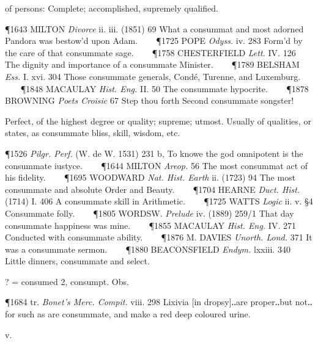 \begin{description}[wide, labelwidth=!, labelindent=0pt]
\begin{myenumerate}
 of persons: Complete; accomplished, supremely qualified.

\P 1643 MILTON  \textit{Divorce} ii. iii. (1851) 69 What a consummat and most adorned Pandora was bestow'd upon Adam.    
\P 1725 POPE  \textit{Odyss.} iv. 283 Form'd by the care of that consummate sage.    
\P 1758 CHESTERFIELD  \textit{Lett.} IV. 126 The dignity and importance of a consummate Minister.    
\P 1789 BELSHAM  \textit{Ess.} I. xvi. 304 Those consummate generals, Condé, Turenne, and Luxemburg.    
\P 1848 MACAULAY  \textit{Hist. Eng.} II. 50 The consummate hypocrite.    
\P 1878 BROWNING  \textit{Poets Croisic} 67 Step thou forth Second consummate songster!

 Perfect, of the highest degree or quality; supreme; utmost. Usually of qualities, or states, as consummate bliss, skill, wisdom, etc.

\P 1526  \textit{Pilgr. Perf.} (W. de W. 1531) 231 b, To knowe the god omnipotent is the consummate iustyce.    
\P 1644 MILTON  \textit{Areop.} 56 The most consummat act of his fidelity.    
\P 1695 WOODWARD  \textit{Nat. Hist. Earth} ii. (1723) 94 The most consummate and absolute Order and Beauty.    
\P 1704 HEARNE  \textit{Duct. Hist.} (1714) I. 406 A consummate skill in Arithmetic.    
\P 1725 WATTS  \textit{Logic} ii. v. §4 Consummate folly.    
\P 1805 WORDSW.  \textit{Prelude} iv. (1889) 259/1 That day consummate happiness was mine.    
\P 1855 MACAULAY  \textit{Hist. Eng.} IV. 271 Conducted with consummate ability.    
\P 1876 M. DAVIES  \textit{Unorth. Lond.} 371 It was a consummate sermon.    
\P 1880 BEACONSFIELD  \textit{Endym.} lxxiii. 340 Little dinners, consummate and select.

 ? = consumed 2, consumpt. Obs.

\P 1684 tr.  \textit{Bonet's Merc. Compit.} viii. 298 Lixivia [in dropsy]‥are proper‥but not‥for such as are consummate, and make a red deep coloured urine.
\end{myenumerate}


 v.

\noindent {}

\vspace{-0.3cm}


\end{description}
